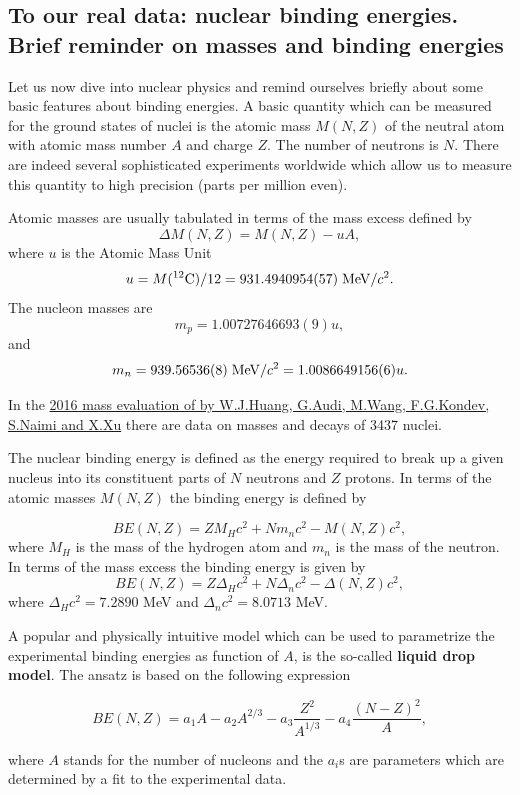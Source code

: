 \documentclass[%
oneside,                 %
final,                   %
10pt]{article}
\begin{document}
\subsection{To our real data: nuclear binding energies. Brief reminder on masses and binding energies}

Let us now dive into  nuclear physics and remind ourselves briefly about some basic features about binding
energies.  A basic quantity which can be measured for the ground
states of nuclei is the atomic mass $M(N, Z)$ of the neutral atom with
atomic mass number $A$ and charge $Z$. The number of neutrons is $N$. There are indeed several sophisticated experiments worldwide which allow us to measure this quantity to high precision (parts per million even). 

Atomic masses are usually tabulated in terms of the mass excess defined by
\[
\Delta M(N, Z) =  M(N, Z) - uA,
\]
where $u$ is the Atomic Mass Unit 
\[
u = M(^{12}\mathrm{C})/12 = 931.4940954(57) \hspace{0.1cm} \mathrm{MeV}/c^2.
\]
The nucleon masses are
\[
m_p =  1.00727646693(9)u,
\] 
and
\[
m_n = 939.56536(8)\hspace{0.1cm} \mathrm{MeV}/c^2 = 1.0086649156(6)u.
\]

In the \href{{http://nuclearmasses.org/resources_folder/Wang_2017_Chinese_Phys_C_41_030003.pdf}}{2016 mass evaluation of by W.J.Huang, G.Audi, M.Wang, F.G.Kondev, S.Naimi and X.Xu}
there are data on masses and decays of 3437 nuclei.

The nuclear binding energy is defined as the energy required to break
up a given nucleus into its constituent parts of $N$ neutrons and $Z$
protons. In terms of the atomic masses $M(N, Z)$ the binding energy is
defined by


\[
BE(N, Z) = ZM_H c^2 + Nm_n c^2 - M(N, Z)c^2 ,
\]
where $M_H$ is the mass of the hydrogen atom and $m_n$ is the mass of the neutron.
In terms of the mass excess the binding energy is given by
\[
BE(N, Z) = Z\Delta_H c^2 + N\Delta_n c^2 -\Delta(N, Z)c^2 ,
\]
where $\Delta_H c^2 = 7.2890$ MeV and $\Delta_n c^2 = 8.0713$ MeV.


A popular and physically intuitive model which can be used to parametrize 
the experimental binding energies as function of $A$, is the so-called 
\textbf{liquid drop model}. The ansatz is based on the following expression

\[ 
BE(N,Z) = a_1A-a_2A^{2/3}-a_3\frac{Z^2}{A^{1/3}}-a_4\frac{(N-Z)^2}{A},
\]

where $A$ stands for the number of nucleons and the $a_i$s are parameters which are determined by a fit 
to the experimental data.  
\end{document}
